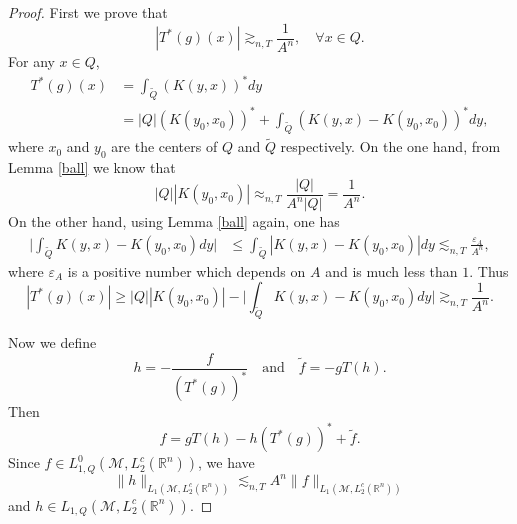 \documentclass[oneside,english,a4wide]{amsart}
\numberwithin{equation}{section}
\numberwithin{figure}{section}
\theoremstyle{plain}
\theoremstyle{plain}
\theoremstyle{definition}
\theoremstyle{plain}
\theoremstyle{remark}
\theoremstyle{definition}
\theoremstyle{remark}
\theoremstyle{definition}
\newcommand{\8}{\infty}
\begin{document}
\begin{proof}
	First we prove that 
	\begin{equation}\label{Tstargx}
		|T^*(g)(x)|\gtrsim_{n,T} \frac{1}{A^n},\quad \forall x\in Q.
	\end{equation}
 For any $x\in Q$,
	\begin{equation*}
		\begin{aligned}
			T^*(g)(x){}&=\int_{\tilde{Q}}(K(y,x))^*dy\\
			&=|{Q}|(K(y_0,x_0))^*+\int_{\tilde{Q}}(K(y,x)-K(y_0,x_0))^*dy,
		\end{aligned}	
	\end{equation*}
where $x_0$ and $y_0$ are the centers of $Q$ and $\tilde{Q}$ respectively.
	On the one hand, from Lemma \ref{ball} we know that
	\begin{equation*}
		|{Q}||K(y_0,x_0)|\approx_{n,T} \frac{|{Q}|}{A^n|{Q}|}=\frac{1}{A^n}.
	\end{equation*}
	On the other hand, using Lemma \ref{ball} again, one has
	\begin{equation*}
		\begin{aligned}
			\bigg|\int_{\tilde{Q}}K(y,x)-K(y_0,x_0)dy\bigg|{}&\le \int_{\tilde{Q}}|K(y,x)-K(y_0,x_0)|dy\lesssim_{n,T} \frac{\varepsilon_A}{A^n},
		\end{aligned}
	\end{equation*}
	where $\varepsilon_A$ is a positive number which depends on $A$ and is much less than $1$. Thus 
	\begin{equation*}
		|T^*(g)(x)|\ge |{Q}||K(y_0,x_0)|-\bigg|\int_{\tilde{Q}}K(y,x)-K(y_0,x_0)dy\bigg|\gtrsim_{n,T} \frac{1}{A^n}.
	\end{equation*}
	
	Now we define
	\begin{equation*}
		h=-\frac{f}{(T^*(g))^*}\quad \text{and}\quad \tilde{f}=-gT(h).
	\end{equation*}
	Then 
	\begin{equation*}
		f=gT(h)-h(T^*(g))^*+\tilde{f}.
	\end{equation*}
    Since $f\in L^0_{1,Q}(\mathcal{M},L_2^c(\mathbb{R}^n))$, we have
	\begin{equation*}
		\|h\|_{L_1(\mathcal{M},L_2^c(\mathbb{R}^n))}\lesssim_{n,T} A^n \|f\|_{L_1(\mathcal{M},L_2^c(\mathbb{R}^n))}
	\end{equation*}
	and $h\in L_{1,Q}(\mathcal{M},L_2^c(\mathbb{R}^n))$.
	

\end{proof}
\end{document}
